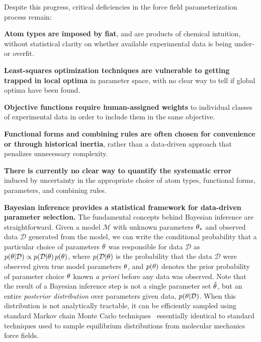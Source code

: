 \documentclass[aps,pre,twocolumn,nofootinbib,superscriptaddress,linenumbers]{revtex4-1}
\newenvironment{packed_itemize}{
\begin{itemize}
  \setlength{\itemsep}{1pt}
  \setlength{\parskip}{0pt}
  \setlength{\parsep}{0pt}
  }{\end{itemize}}
\begin{document}
Despite this progress, critical deficiencies in the force field parameterization process remain:
\begin{packed_itemize}
\item {\bf Atom types are imposed by fiat}, and are products of chemical intuition, without statistical clarity on whether available experimental data is being under- or overfit.
\item {\bf Least-squares optimization techniques are vulnerable to getting trapped in local optima} in parameter space, with no clear way to tell if global optima have been found.
\item {\bf Objective functions require human-assigned weights} to individual classes of experimental data in order to include them in the same objective.~\citep{paliwal_phd}
\item {\bf Functional forms and combining rules are often chosen for convenience or through historical inertia}, rather than a data-driven approach that penalizes unnecessary complexity.
\item {\bf There is currently no clear way to quantify the systematic error} induced by uncertainty in the appropriate choice of atom types, functional forms, parameters, and combining rules.  
\end{packed_itemize}

{\bf Bayesian inference provides a statistical framework for data-driven parameter selection.}
The fundamental concepts behind Bayesian inference are straightforward.
Given a model $\mathcal{M}$ with unknown parameters ${\bf \theta}_*$ and observed data $\mathcal{D}$ generated from the model, we can write the conditional probability that a particular choice of parameters ${\bf \theta}$ was responsible for data $\mathcal{D}$ as
$p({\bf \theta} | \mathcal{D}) \propto p(\mathcal{D} | {\bf \theta}) \, p({\bf \theta})$,
where $p(\mathcal{D} | {\bf \theta})$ is the probability that the data $\mathcal{D}$ were observed given true model parameters ${\bf \theta}$, and $p({\bf \theta})$ denotes the prior probability of parameter choice ${\bf \theta}$ known \emph{a priori} before any data was observed.
Note that the result of a Bayesian inference step is not a single parameter set $\hat{\bf \theta}$, but an entire \emph{posterior distribution} over parameters given data, $p({\bf \theta} | \mathcal{D})$.
When this distribution is not analytically tractable, it can be efficiently sampled using standard Markov chain Monte Carlo techniques~\cite{jun-s-liu:mcmc} essentially identical to standard techniques used to sample equilibrium distributions from molecular mechanics force fields.
\end{document}
